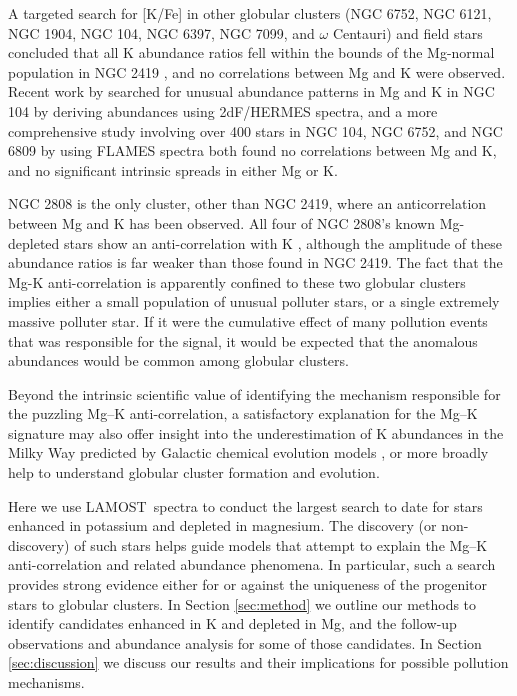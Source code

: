 \documentclass[a4paper,fleqn,usenatbib]{mnras}
\newcommand{\project}[1]{#1}
\newcommand{\lamost}{\project{LAMOST}}
\begin{document}
A targeted search for [K/Fe] in other globular clusters (NGC 6752, NGC 6121, NGC 1904, NGC 104, NGC 6397, NGC 7099, and $\omega$ Centauri) and field stars concluded that all K abundance ratios fell within the bounds of the Mg-normal population in NGC 2419 \citep{carretta2013}, and no correlations between Mg and K were observed. Recent work by \cite{cerniauskas201747tuc} searched for unusual abundance patterns in Mg and K in NGC 104 by deriving abundances using 2dF/HERMES spectra, and a more comprehensive study involving over 400 stars in NGC 104, NGC 6752, and NGC 6809 by \cite{mucciarelli2017K} using FLAMES spectra \citep{cerniauskas201747tuc} both found no correlations between Mg and K, and no significant intrinsic spreads in either Mg or K.

NGC 2808 is the only cluster, other than NGC 2419, where an anticorrelation between Mg and K has been observed. All four of NGC 2808's known Mg-depleted stars show an anti-correlation with K \citep{mucciarelli2015}, although the amplitude of these abundance ratios is far weaker than those found in NGC 2419. The fact that the Mg-K anti-correlation is apparently confined to these two globular clusters implies either a small population of unusual polluter stars, or a single extremely massive polluter star. If it were the cumulative effect of many pollution events that was responsible for the signal, it would be expected that the anomalous abundances would be common among globular clusters.

Beyond the intrinsic scientific value of identifying the mechanism responsible for the puzzling Mg--K anti-correlation, a satisfactory explanation for the Mg--K signature may also offer insight into the underestimation of K abundances in the Milky Way predicted by Galactic chemical evolution models \citep{kobayashi2011}, or more broadly help to understand globular cluster formation and evolution. 

Here we use \lamost\ spectra to conduct the largest search to date for stars enhanced in potassium and depleted in magnesium. The discovery (or non-discovery) of such stars helps guide models that attempt to explain the Mg--K anti-correlation and related abundance phenomena. In particular, such a search provides strong evidence either for or against the uniqueness of the progenitor stars to globular clusters. In Section \ref{sec:method} we outline our methods to identify candidates enhanced in K and depleted in Mg, and the follow-up observations and abundance analysis for some of those candidates. In Section \ref{sec:discussion} we discuss our results and their implications for possible pollution mechanisms. 
\end{document}
